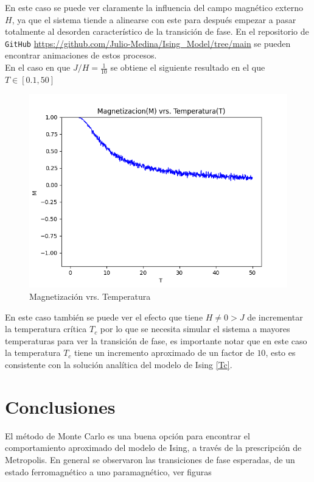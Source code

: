 \documentclass[a4paper]{article}
\begin{document}
En este caso se puede ver claramente la influencia del campo magnético externo $H$, ya que el sistema tiende a alinearse con este para después empezar a pasar totalmente al desorden característico de la transición de fase. En el repositorio de \texttt{GitHub} \url{https://github.com/Julio-Medina/Ising_Model/tree/main} se pueden encontrar animaciones de estos procesos.\\

En el caso en que $J/H=\frac{1}{10}$ se obtiene el siguiente resultado en el que $T\in[0.1,50]$ 
\begin{figure}[H]
\begin{center}
\includegraphics[scale=0.6]{PlotMvT_sim4.png} 
\end{center} 
\caption{Magnetización vrs. Temperatura}
\end{figure}
En este caso también se puede ver el efecto que tiene $H\neq0>J$ de incrementar la temperatura crítica $T_c$ por lo que se necesita simular el sistema a mayores temperaturas para ver la transición de fase, es importante notar que en este caso la temperatura $T_c$ tiene un incremento aproximado de un factor de $10$, esto es consistente con la solución analítica del modelo de Ising \ref{Tc}.



\section{Conclusiones}
El método de Monte Carlo es una buena opción para encontrar el comportamiento aproximado del modelo de Ising, a través de la prescripción de Metropolis. En general se observaron las transiciones de fase esperadas, de un estado ferromagnético a uno paramagnético, ver figuras
\end{document}
